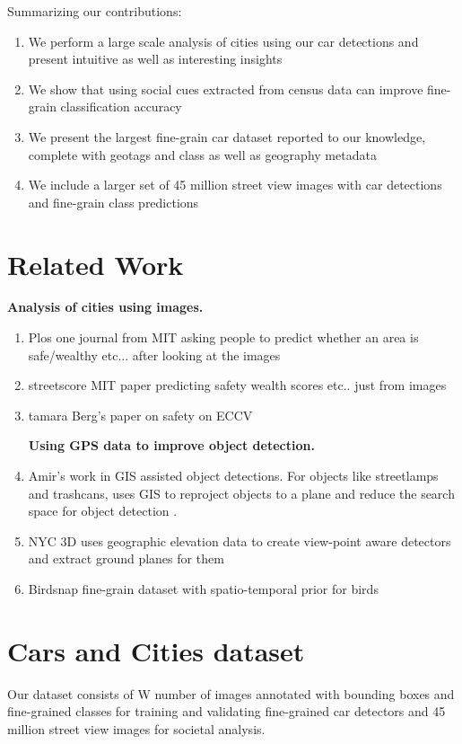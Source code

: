 \documentclass[10pt,twocolumn,letterpaper]{article}
\begin{document}
Summarizing our contributions:
  \begin{enumerate}
    \item We perform a large scale analysis of cities using our car detections and present intuitive as well as interesting insights
    \item We show that using social cues extracted from census data can improve fine-grain classification accuracy
    \item We present the largest fine-grain car dataset reported to our knowledge, complete with geotags and class as well as geography metadata  
    \item We include a larger set of 45 million street view images with car detections and fine-grain class predictions
  \end{enumerate}

\section{Related Work}
\textbf{Analysis of cities using images.}
  \begin{enumerate}
     \item Plos one journal from MIT asking people to predict whether an area is safe/wealthy etc... after looking at the images
     \item streetscore MIT paper predicting safety wealth scores etc.. just from images~\cite{MIT_vision}
     \item tamara Berg's paper on safety on ECCV
     ~\cite{zhang2014part}
     ~\cite{caltech_birds}

\textbf{Using GPS data to improve object detection.}
     \item Amir's work in GIS assisted object detections. For objects like streetlamps and trashcans, uses GIS to reproject objects to a plane and reduce the search space for object detection .
     \item NYC 3D uses geographic elevation data to create view-point aware detectors and extract ground planes for  them
     \item Birdsnap fine-grain dataset with spatio-temporal prior for birds

  \end{enumerate}

\section{Cars and Cities dataset}
Our dataset consists of W number of images annotated with bounding boxes and fine-grained classes for training and validating fine-grained car detectors and 45 million street view images for societal analysis.
\end{document}

